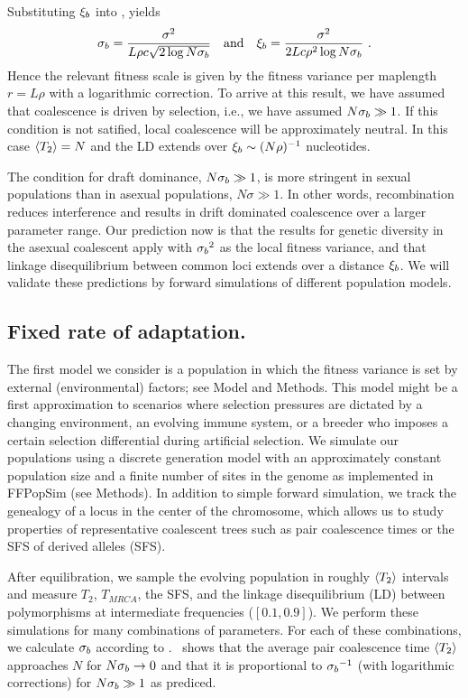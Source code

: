 Substituting ${\xi_b}$ into , yields
\begin{equation}
  \label{eq:self_consist}
  \sigblockT = \frac{\sigma^2}{L\xo c\sqrt{2\log N\sigblockT}} \quad
  \mathrm{and} \quad \blockT = \frac{\sigma^2}{2Lc\xo^2 \log
    N\sigblockT} \ .
\end{equation}
Hence the relevant fitness scale is given by the
fitness variance per maplength $r = L\rho$ with a logarithmic correction. 
To arrive at this result, we have assumed that coalescence is driven
by selection, i.e., we have assumed $N{\sigma_b}\gg 1$. If this
condition is not satified, local coalescence will be approximately
neutral. In this case $\langle T_2\rangle = N$ and the LD extends over
${\xi_b}\sim (N\rho)^{-1}$ nucleotides.

The condition for draft dominance, $N{\sigma_b}\gg 1$, is more
stringent in sexual populations than in asexual populations,
$N\sigma\gg 1$. In other words, recombination reduces interference and
results in drift dominated coalescence over a larger parameter range. 
Our prediction now is that the results for genetic diversity in the
asexual coalescent apply with ${\sigma_b}^2$ as the local fitness variance,
and that linkage disequilibrium between common loci extends over
a distance ${\xi_b}$. We will validate these predictions by forward
simulations of different population models.

\subsection*{Fixed rate of adaptation.}
The first model we consider is a population in which the fitness
variance is set by external (environmental) factors; see Model and
Methods. This model might be a first approximation to scenarios where
selection pressures are dictated by a changing environment, an evolving
immune system, or a breeder who imposes a certain selection differential
during artificial selection.  We simulate our populations using a
discrete generation model with an approximately constant population size
and a finite number of sites in the genome as implemented in FFPopSim
\cite{zanini_ffpopsim:_2012} (see Methods).  In addition to simple
forward simulation, we track the genealogy of a locus in the center of
the chromosome, which allows us to study properties of representative
coalescent trees such as pair coalescence times or the SFS of derived
alleles (SFS).

After equilibration, we sample the evolving population in roughly
$\langle T_2\rangle$ intervals and measure $T_2$, $T_{MRCA}$, the SFS, and the
linkage disequilibrium (LD) between polymorphisms at intermediate
frequencies ($[0.1, 0.9]$). We perform these simulations for many
combinations of parameters. For each of these combinations, we calculate
${\sigma_b}$ according to . \FigTtwo~shows
that the average pair coalescence time $\langle T_2\rangle$ approaches $N$ for
$N{\sigma_b}\to 0$ and that it is proportional to ${\sigma_b}^{-1}$ (with
logarithmic corrections) for $N{\sigma_b}\gg 1$ as prediced.

